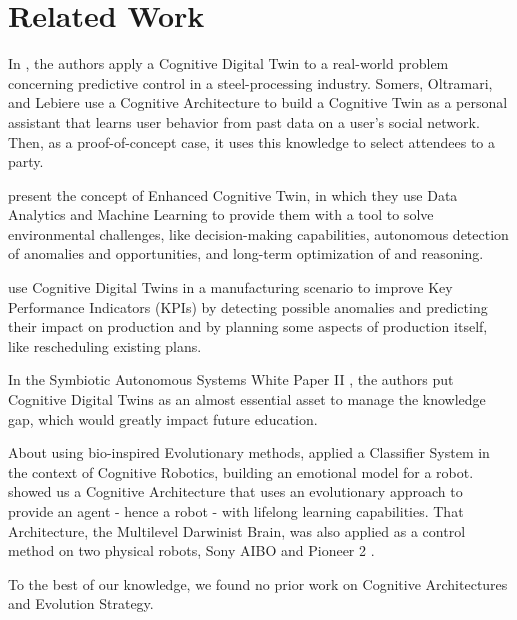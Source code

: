 \section{Related Work}
\label{relatedwork}


In \cite{abburu2020cognitive}, the authors apply a Cognitive Digital Twin to a real-world problem concerning predictive control in a steel-processing industry. Somers, Oltramari, and Lebiere \citep{somerscognitive, somers2020cognitive} use a Cognitive Architecture to build a Cognitive Twin as a personal assistant that learns user behavior from past data on a user's social network. Then, as a proof-of-concept case, it uses this knowledge to select attendees to a party. 

\cite{eirinakis2020enhancing} present the concept of Enhanced Cognitive Twin, in which they use Data Analytics and Machine Learning to provide them with a tool to solve environmental challenges, like decision-making capabilities, autonomous detection of anomalies and opportunities, and long-term optimization of and reasoning.

\cite{rozanec2020towards} use Cognitive Digital Twins in a manufacturing scenario to improve Key Performance Indicators (KPIs) by detecting possible anomalies and predicting their impact on production and by planning some aspects of production itself, like rescheduling existing plans.

In the Symbiotic Autonomous Systems White Paper II \citep{initiative2018symbiotic}, the authors put Cognitive Digital Twins as an almost essential asset to manage the knowledge gap, which would greatly impact future education.


 About using bio-inspired Evolutionary methods, \cite{zhang2020affective} applied a Classifier System in the context of Cognitive Robotics, building an emotional model for a robot. \cite{bellas2010multilevel} showed us a Cognitive Architecture that uses an evolutionary approach to provide an agent - hence a robot - with lifelong learning capabilities. That Architecture, the Multilevel Darwinist Brain, was also applied as a control method on two physical robots, Sony AIBO and Pioneer 2 \citep{bellas2006adaptive}.

To the best of our knowledge, we found no prior work on Cognitive Architectures and Evolution Strategy.